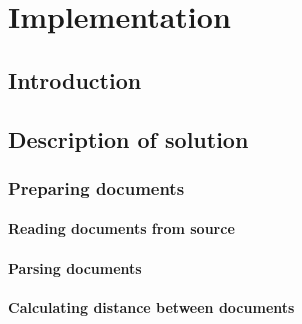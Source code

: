 \chapter{Implementation} \label{implementation}

\section{Introduction}

\section{Description of solution}

\subsection{Preparing  documents}

\subsubsection{Reading documents from source}

\subsubsection{Parsing documents}

\subsubsection{Calculating distance between documents}
